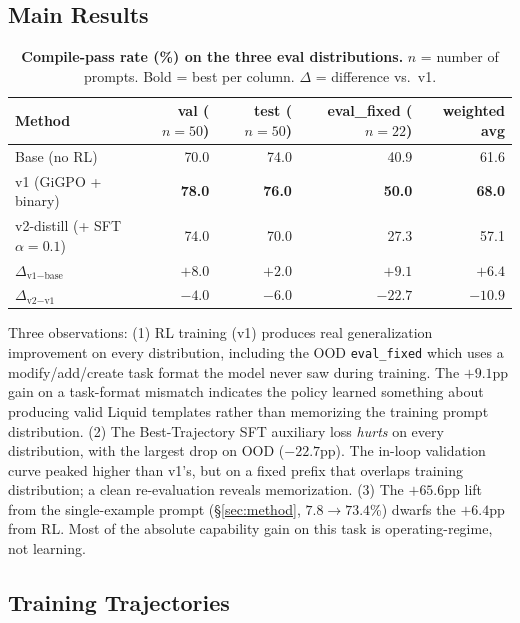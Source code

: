 \documentclass[10pt]{article}
\begin{document}
\subsection{Main Results}

\begin{table}[t]
\centering
\caption{\textbf{Compile-pass rate (\%) on the three eval distributions.}
$n$ = number of prompts. Bold = best per column.
$\Delta$ = difference vs.\ v1.}
\label{tab:main}
\small
\setlength{\tabcolsep}{6pt}
\begin{tabular}{lrrrr}
\toprule
\textbf{Method} & \textbf{val} ($n{=}50$) & \textbf{test} ($n{=}50$) & \textbf{eval\_fixed} ($n{=}22$) & \textbf{weighted avg} \\
\midrule
Base (no RL)             & 70.0           & 74.0           & 40.9           & 61.6 \\
v1 (GiGPO + binary)      & \textbf{78.0}  & \textbf{76.0}  & \textbf{50.0}  & \textbf{68.0} \\
v2-distill (+ SFT $\alpha{=}0.1$) & 74.0           & 70.0           & 27.3           & 57.1 \\
\midrule
$\Delta_{\text{v1}-\text{base}}$ & $+8.0$ & $+2.0$ & $+9.1$ & $+6.4$ \\
$\Delta_{\text{v2}-\text{v1}}$   & $-4.0$ & $-6.0$ & $-22.7$ & $-10.9$ \\
\bottomrule
\end{tabular}
\end{table}

Three observations:
(1) RL training (v1) produces real generalization improvement on every
distribution, including the OOD \texttt{eval\_fixed} which uses a
modify/add/create task format the model never saw during training.
The $+9.1$pp gain on a task-format mismatch indicates the policy learned
something about producing valid Liquid templates rather than memorizing
the training prompt distribution.
(2) The Best-Trajectory SFT auxiliary loss \emph{hurts} on every distribution,
with the largest drop on OOD (\(-22.7\)pp). The in-loop validation curve
peaked higher than v1's, but on a fixed prefix that overlaps training
distribution; a clean re-evaluation reveals memorization.
(3) The $+65.6$pp lift from the single-example prompt
(\S\ref{sec:method}, $7.8 \to 73.4$\%) dwarfs the $+6.4$pp from RL.
Most of the absolute capability gain on this task is operating-regime,
not learning.

\subsection{Training Trajectories}
\label{sec:trajectories}
\end{document}
